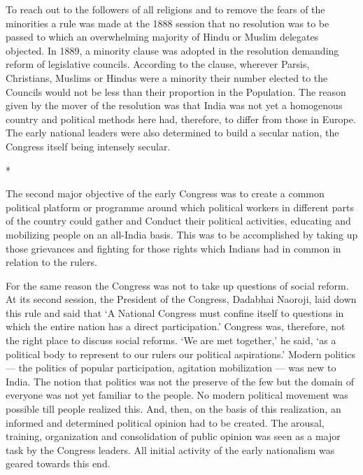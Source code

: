 To reach out to the followers of all religions and to remove the fears of the minorities a rule was made at the 1888 session that no resolution was to be passed to which an overwhelming majority of Hindu or Muslim delegates objected. In 1889, a minority clause was adopted in the resolution demanding reform of legislative councils. According to the clause, wherever Parsis, Christians, Muslims or Hindus were a minority their number elected to the Councils would not be less than their proportion in the Population. The reason given by the mover of the resolution was that India was not yet a homogenous country and political methods here had, therefore, to differ from those in Europe. The early national leaders were also determined to build a secular nation, the Congress itself being intensely secular.

\begin{center}*\end{center}



The second major objective of the early Congress was to create a common political platform or programme around which political workers in different parts of the country could gather and Conduct their political activities, educating and mobilizing people on an all-India basis. This was to be accomplished by taking up those grievances and fighting for those rights which Indians had in common in relation to the rulers.

For the same reason the Congress was not to take up questions of social reform. At its second session, the President of the Congress, Dadabhai Naoroji, laid down this rule and said that ‘A National Congress must confine itself to questions in which the entire nation has a direct participation.’ Congress was, therefore, not the right place to discuss social reforms. ‘We are met together,’ he said, ‘as a political body to represent to our rulers our political aspirations.’ Modern politics — the politics of popular participation, agitation mobilization — was new to India. The notion that politics was not the preserve of the few but the domain of everyone was not yet familiar to the people. No modern political movement was possible till people realized this. And, then, on the basis of this realization, an informed and determined political opinion had to be created. The arousal, training, organization and consolidation of public opinion was seen as a major task by the Congress leaders. All initial activity of the early nationalism was geared towards this end.


